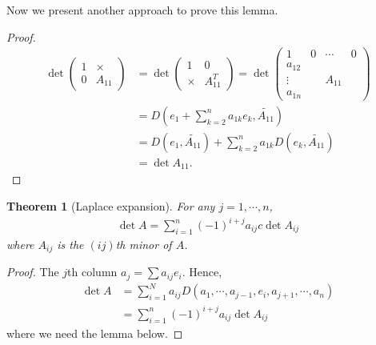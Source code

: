 \documentclass[11pt]{book}
\newtheorem{theorem}{Theorem}[section]
\theoremstyle{definition}
\numberwithin{equation}{subsection}
\begin{document}
Now we present another approach to prove this lemma.
\begin{proof}
\begin{align*}
    \det \left(
    \begin{matrix}
        1 & \times\\
        0 & A_{11}
    \end{matrix}
    \right) & = \det \left(
    \begin{matrix}
        1 & 0\\
        \times & A_{11}^T
    \end{matrix}
    \right) = \det \left(
    \begin{matrix}
        1      & 0 & \cdots & 0\\
        a_{12} &  &\\
        \vdots &  & A_{11}\\
        a_{1n}
    \end{matrix}
    \right)\\
    & = D\left(e_1 + \sum^n_{k=2}a_{1k}e_k, \widetilde{A_{11}}\right) \\
    & = D(e_1, \widetilde{A_{11}}) + \sum^n_{k=2}a_{1k} D(e_k, \widetilde{A_{11}}) \\
    & = \det A_{11}.
\end{align*}
\end{proof}

\medskip

\begin{theorem}[Laplace expansion]
For any $j = 1,\cdots,n$, 
\begin{align*}
    \det A = \sum^n_{i=1}(-1)^{i+j} a_{ij}c\det A_{ij}
\end{align*}
where $A_{ij}$ is the $(ij)$th minor of $A$.
\end{theorem}
\begin{proof}
The $j$th column $a_j = \sum a_{ij} e_i$. Hence,
\begin{align*}
    \det A & = \sum^N_{i=1} a_{ij} D(a_1,\cdots,a_{j-1},e_i, a_{j+1},\cdots,a_n) \\
    & = \sum^n_{i=1} (-1)^{i+j} a_{ij} \det A_{ij}
\end{align*}
where we need the lemma below.
\end{proof}

\medskip
\end{document}

